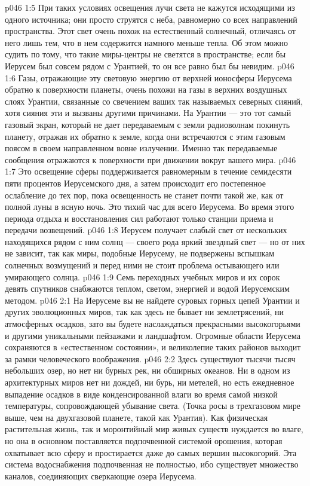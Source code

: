 \vs p046 1:5 При таких условиях освещения лучи света не кажутся исходящими из одного источника; они просто струятся с неба, равномерно со всех направлений пространства. Этот свет очень похож на естественный солнечный, отличаясь от него лишь тем, что в нем содержится намного меньше тепла. Об этом можно судить по тому, что такие миры\hyp{}центры не светятся в пространстве; если бы Иерусем был совсем рядом с Урантией, то он все равно был бы невидим.
\vs p046 1:6 Газы, отражающие эту световую энергию от верхней ионосферы Иерусема обратно к поверхности планеты, очень похожи на газы в верхних воздушных слоях Урантии, связанные со свечением ваших так называемых северных сияний, хотя сияния эти и вызваны другими причинами. На Урантии --- это тот самый газовый экран, который не дает передаваемым с земли радиоволнам покинуть планету, отражая их обратно к земле, когда они встречаются с этим газовым поясом в своем направленном вовне излучении. Именно так передаваемые сообщения отражаются к поверхности при движении вокруг вашего мира.
\vs p046 1:7 Это освещение сферы поддерживается равномерным в течение семидесяти пяти процентов Иерусемского дня, а затем происходит его постепенное ослабление до тех пор, пока освещенность не станет почти такой же, как от полной луны в ясную ночь. Это тихий час для всего Иерусема. Во время этого периода отдыха и восстановления сил работают только станции приема и передачи возвещений.
\vs p046 1:8 \pc Иерусем получает слабый свет от нескольких находящихся рядом с ним солнц --- своего рода яркий звездный свет --- но от них не зависит, так как миры, подобные Иерусему, не подвержены вспышкам солнечных возмущений и перед ними не стоит проблема остывающего или умирающего солнца.
\vs p046 1:9 Семь переходных учебных миров и их сорок девять спутников снабжаются теплом, светом, энергией и водой Иерусемским методом.
\vs p046 2:1 На Иерусеме вы не найдете суровых горных цепей Урантии и других эволюционных миров, так как здесь не бывает ни землетрясений, ни атмосферных осадков, зато вы будете наслаждаться прекрасными высокогорьями и другими уникальными пейзажами и ландшафтом. Огромные области Иерусема сохраняются в «естественном состоянии», и великолепие таких районов выходит за рамки человеческого воображения.
\vs p046 2:2 Здесь существуют тысячи тысяч небольших озер, но нет ни бурных рек, ни обширных океанов. Ни в одном из архитектурных миров нет ни дождей, ни бурь, ни метелей, но есть ежедневное выпадение осадков в виде конденсированной влаги во время самой низкой температуры, сопровождающей убывание света. (Точка росы в трехгазовом мире выше, чем на двухгазовой планете, такой как Урантия). Как физическая растительная жизнь, так и моронтийный мир живых существ нуждается во влаге, но она в основном поставляется подпочвенной системой орошения, которая охватывает всю сферу и простирается даже до самых вершин высокогорий. Эта система водоснабжения подпочвенная не полностью, ибо существует множество каналов, соединяющих сверкающие озера Иерусема.
